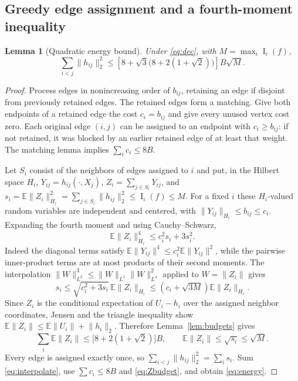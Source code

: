 \documentclass[11pt,letterpaper]{article}
\newtheorem{lemma}[theorem]{Lemma}
\theoremstyle{definition}
\newcommand{\E}{\mathbb E}
\newcommand{\Inf}{\operatorname{I}}
\newcommand{\norm}[1]{\lVert #1\rVert}
\begin{document}
\subsection{Greedy edge assignment and a fourth-moment inequality}
\begin{lemma}[Quadratic energy bound]\label{lem:energy}
Under \eqref{eq:dec}, with $M=\max_i\Inf_i(f)$,
\begin{equation}\label{eq:energy}
\sum_{i<j}\norm{h_{ij}}_2^2\le
\left[8+\sqrt3\bigl(8+2(1+\sqrt2)\bigr)\right]B\sqrt M.
\end{equation}
\end{lemma}
\begin{proof}
Process edges in nonincreasing order of $b_{ij}$, retaining an edge if disjoint from previously retained edges. The retained edges form a matching. Give both endpoints of a retained edge the cost $c_i=b_{ij}$ and give every unused vertex cost zero. Each original edge $(i,j)$ can be assigned to an endpoint with $c_i\ge b_{ij}$: if not retained, it was blocked by an earlier retained edge of at least that weight. The matching lemma implies $\sum_i c_i\le8B$.

Let $S_i$ consist of the neighbors of edges assigned to $i$ and put, in the Hilbert space $H_i$,
$Y_{ij}=h_{ij}(\cdot,X_j)$, $Z_i=\sum_{j\in S_i}Y_{ij}$, and
$s_i=\E\norm{Z_i}_{H_i}^2=\sum_{j\in S_i}\norm{h_{ij}}_2^2\le\Inf_i(f)\le M$.
For a fixed $i$ these $H_i$-valued random variables are independent and centered, with $\norm{Y_{ij}}_{H_i}\le b_{ij}\le c_i$. Expanding the fourth moment and using Cauchy--Schwarz,
\begin{equation}\label{eq:4moment}
\E\norm{Z_i}_{H_i}^4\le c_i^2s_i+3s_i^2.
\end{equation}
Indeed the diagonal terms satisfy $\E\norm{Y_{ij}}^4\le c_i^2\E\norm{Y_{ij}}^2$, while the pairwise inner-product terms are at most products of their second moments. The interpolation $\norm W_{L^2}^3\le\norm W_{L^1}\norm W_{L^4}^2$ applied to $W=\norm{Z_i}$ gives
\begin{equation}\label{eq:interpolate}
s_i\le\sqrt{c_i^2+3s_i}\,\E\norm{Z_i}_{H_i}
\le(c_i+\sqrt{3M})\E\norm{Z_i}_{H_i}.
\end{equation}
Since $Z_i$ is the conditional expectation of $U_i-h_i$ over the assigned neighbor coordinates, Jensen and the triangle inequality show
$\E\norm{Z_i}\le\E\norm{U_i}+\norm{h_i}_2$.
Therefore Lemma~\ref{lem:budgets} gives
\begin{equation}\label{eq:Zbudget}
\sum_i\E\norm{Z_i}\le\bigl[8+2(1+\sqrt2)\bigr]B,
\qquad \E\norm{Z_i}\le\sqrt{s_i}\le\sqrt M.
\end{equation}
Every edge is assigned exactly once, so $\sum_{i<j}\norm{h_{ij}}_2^2=\sum_i s_i$. Sum \eqref{eq:interpolate}, use $\sum c_i\le8B$ and \eqref{eq:Zbudget}, and obtain \eqref{eq:energy}.
\end{proof}
\end{document}
